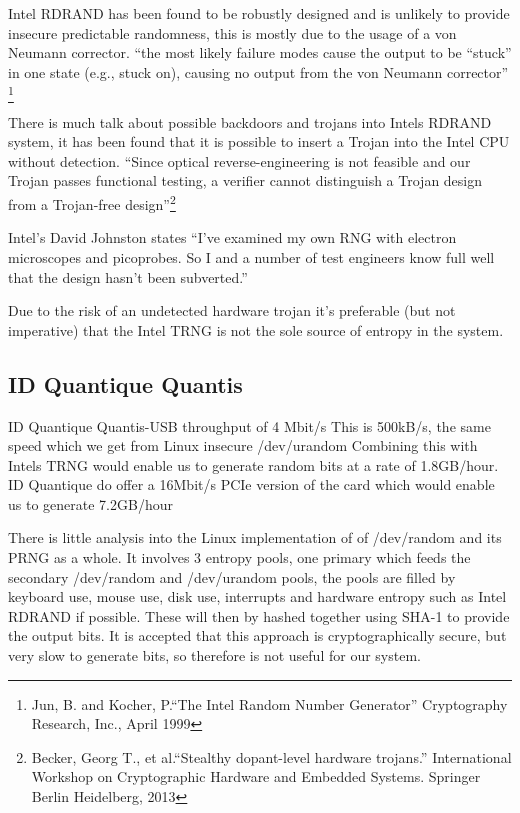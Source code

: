 \documentclass{paper}
\begin{document}
			Intel RDRAND has been found to be robustly designed and is unlikely to provide insecure predictable randomness, this is mostly due to the usage of a von Neumann corrector. ``the most likely failure modes cause the output to be “stuck” in one state (e.g., stuck on), causing no output from the von Neumann corrector'' \footnote{Jun, B. and Kocher, P.``The Intel Random Number Generator'' Cryptography Research, Inc., April 1999}
			
			There is much talk about possible backdoors and trojans into Intels RDRAND system, it has been found that it is possible to insert a 
			Trojan into the Intel CPU without detection. 
			``Since optical reverse-engineering is not feasible and our Trojan passes functional testing, a verifier cannot distinguish a Trojan design from a Trojan-free design''\footnote{Becker, Georg T., et al.``Stealthy dopant-level hardware trojans.'' International Workshop on Cryptographic Hardware and Embedded Systems. Springer Berlin Heidelberg, 2013}
				
			Intel's David Johnston states ``I’ve examined my own RNG with electron microscopes and picoprobes. So I and a number of test engineers know full well that the design hasn’t been subverted.''
				
			Due to the risk of an undetected hardware trojan it's preferable (but not imperative) that the Intel TRNG is not the sole source of entropy in the system.
			
		\subsection{ID Quantique Quantis}
			
			
			
			ID Quantique Quantis-USB throughput of 4 Mbit/s 
			This is 500kB/s, the same speed which we get from Linux insecure /dev/urandom
			Combining this with Intels TRNG would enable us to generate random bits at a rate
			of 1.8GB/hour. 
			ID Quantique do offer a 16Mbit/s PCIe version of the card which would enable us 
			to generate 7.2GB/hour
			
			
			
			There is little analysis into the Linux implementation of of /dev/random and its
			PRNG as a whole. It involves 3 entropy pools, one primary which feeds the 
			secondary /dev/random and /dev/urandom pools, the pools are filled by keyboard 
			use, mouse use, disk use, interrupts and hardware entropy such as Intel RDRAND 
			if possible. 
			These will then by hashed together using SHA-1 to provide the output bits. It is 
			accepted that this approach is cryptographically secure, but very slow to 
			generate bits, so therefore is not useful for our system.
			
\end{document}
